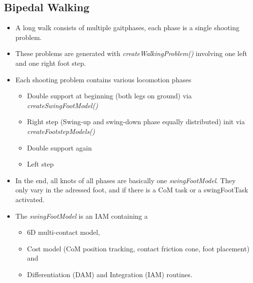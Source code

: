 \subsection{Bipedal Walking}
\begin{itemize}
\item A long walk consists of multiple gaitphases, each phase is a single shooting problem.
\item These problems are generated with \textit{createWalkingProblem()} involving one left and one right foot step.
\item Each shooting problem contains various locomotion phases
	\begin{itemize}
	\item Double support at beginning (both legs on ground) via \textit{createSwingFootModel()}
	\item Right step (Swing-up and swing-down phase equally distributed) init via    	\textit{createFootstepModels()}
	\item Double support again
	\item Left step
	\end{itemize}	
\item In the end, all knots of all phases are basically one \textit{swingFootModel}. They only vary in the adressed foot, and if there is a CoM task or a swingFootTask activated.
\item The \textit{swingFootModel} is an IAM containing a 
	\begin{itemize}
	\item 6D multi-contact model,
	\item Cost model (CoM position tracking, contact friction cone, foot placement) and
	\item Differentiation (DAM) and Integration (IAM) routines.
	\end{itemize}
\end{itemize}



